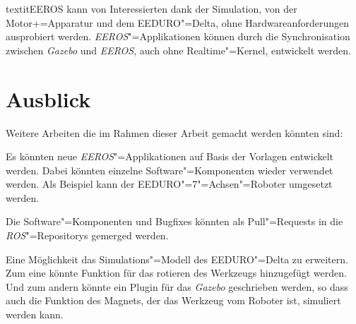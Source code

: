 textit{EEROS} kann von Interessierten dank der Simulation, von der Motor+=Apparatur und dem EEDURO"=Delta, ohne Hardwareanforderungen ausprobiert werden.
\textit{EEROS}"=Applikationen können durch die Synchronisation zwischen \textit{Gazebo} und \textit{EEROS}, auch ohne Realtime"=Kernel, entwickelt werden.

 

\section{Ausblick}

Weitere Arbeiten die im Rahmen dieser Arbeit gemacht werden könnten sind:

Es könnten neue \textit{EEROS}"=Applikationen auf Basis der Vorlagen entwickelt werden.
Dabei könnten einzelne Software"=Komponenten wieder verwendet werden.
Als Beispiel kann der EEDURO"=7"=Achsen"=Roboter umgesetzt werden.

Die Software"=Komponenten und Bugfixes könnten als Pull"=Requests in die \textit{ROS}"=Repositorys gemerged werden.

Eine Möglichkeit das Simulations"=Modell des EEDURO"=Delta zu erweitern.
Zum eine könnte Funktion für das rotieren des Werkzeugs hinzugefügt werden.
Und zum andern könnte ein Plugin für das \textit{Gazebo} geschrieben werden, so dass auch die Funktion des Magnets, der das Werkzeug vom Roboter ist, simuliert werden kann.


